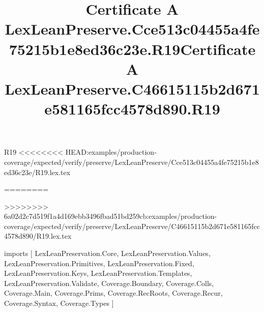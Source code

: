 \begin{lexlean}{R19}
<<<<<<<< HEAD:examples/production-coverage/expected/verify/preserve/LexLeanPreserve/Cce513c04455a4fe75215b1e8ed36c23e/R19.lex.tex
\title{Certificate A LexLeanPreserve.Cce513c04455a4fe75215b1e8ed36c23e.R19}
========
\title{Certificate A LexLeanPreserve.C46615115b2d671e581165fcc4578d890.R19}
>>>>>>>> 6a02d2c7d519f1a4d169ebb3496fbad51bd259cb:examples/production-coverage/expected/verify/preserve/LexLeanPreserve/C46615115b2d671e581165fcc4578d890/R19.lex.tex
\begin{coremodule}
imports [
  LexLeanPreservation.Core,
  LexLeanPreservation.Values,
  LexLeanPreservation.Primitives,
  LexLeanPreservation.Fixed,
  LexLeanPreservation.Keys,
  LexLeanPreservation.Templates,
  LexLeanPreservation.Validate,
  Coverage.Boundary,
  Coverage.Colls,
  Coverage.Main,
  Coverage.Prims,
  Coverage.RecRoots,
  Coverage.Recur,
  Coverage.Syntax,
  Coverage.Types
]


\end{coremodule}
\end{lexlean}
